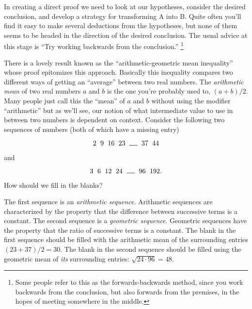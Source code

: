 In creating a direct proof we need to look at our hypotheses, consider 
the desired conclusion, and develop a strategy for transforming A into B.
Quite often you'll find it easy to make several deductions from the 
hypotheses, but none of them seems to be headed in the direction of 
the desired conclusion.  The usual advice at this stage is 
``Try working backwards from the conclusion.''
\footnote{Some people refer to this as the forwards-backwards method, since %
you work backwards from the conclusion, but also forwards from the premises, %
in the hopes of meeting somewhere in the middle.}  

There is a lovely result known as the 
``arithmetic-geometric mean inequality''
whose proof epitomizes this approach.  Basically this inequality compares two
different ways of getting an ``average'' between two real numbers.  The 
\emph{arithmetic mean} of two real numbers $a$ and $b$ is the one you're 
probably used to, $(a+b)/2$.   Many people just call this the ``mean''
of $a$ and $b$ without using the modifier ``arithmetic'' but as we'll
see, our notion of what intermediate value to use in between two numbers
is dependent on context.  Consider the following two sequences of numbers
(both of which have a missing entry) 

\[ 2 \rule{6pt}{0pt} 9  \rule{6pt}{0pt} 16  \rule{6pt}{0pt} 23  \rule{6pt}{0pt} \rule{12pt}{.5pt}  \rule{6pt}{0pt} 37  \rule{6pt}{0pt} 44 \]

\noindent and

\[ 3 \rule{6pt}{0pt} 6  \rule{6pt}{0pt} 12  \rule{6pt}{0pt} 24  \rule{6pt}{0pt} \rule{12pt}{.5pt}  \rule{6pt}{0pt} 96  \rule{6pt}{0pt} 192. \]

\noindent How should we fill in the blanks?

The first sequence is an 
\emph{arithmetic sequence}.  
Arithmetic sequences 
are characterized by the property that the difference between successive
terms is a constant.  The second sequence is a 
\emph{geometric sequence}. 
Geometric sequences have the property that the ratio of successive terms 
is a constant.  The blank in the first sequence should be filled with the 
arithmetic mean of the surrounding entries $(23+37)/2 = 30$.  The blank 
in the second sequence should be filled using the 
geometric mean
of \emph{its} surrounding entries: $\sqrt{24\cdot 96} = 48$.

